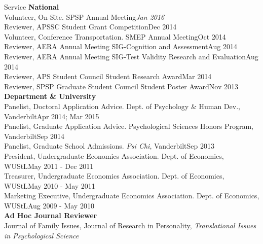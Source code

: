 \documentclass {resume}
\begin{document}
\begin{rSection}{\textrm{Service}}
{\large \textbf{National}}\\
Volunteer, On-Site. SPSP Annual Meeting\hfill{\textit{Jan 2016}}\smallskip\\
Reviewer, APSSC Student Grant Competition\hfill{Dec 2014}\smallskip\\
Volunteer, Conference Transportation. SMEP Annual Meeting\hfill{Oct 2014}\smallskip\\
Reviewer, AERA Annual Meeting SIG-Cognition and Assessment\hfill{Aug 2014}\smallskip\\%
Reviewer, AERA Annual Meeting SIG-Test Validity Research and Evaluation\hfill{Aug 2014}\smallskip\\
Reviewer, APS Student Council Student Research Award\hfill{Mar 2014}\smallskip\\
Reviewer, SPSP Graduate Student Council Student Poster Award\hfill{Nov 2013}\medskip\\
{\large \textbf{Department \& University}}\\
Panelist, Doctoral Application Advice. Dept. of Psychology \& Human Dev., Vanderbilt\hfill {Apr 2014; Mar 2015}\smallskip\\
Panelist, Graduate Application Advice. Psychological Sciences Honors Program, Vanderbilt\hfill {Sep 2014}\smallskip\\
Panelist, Graduate School Admissions. \textit{Psi Chi}, Vanderbilt\hfill {Sep 2013}\smallskip\\
President, Undergraduate Economics Association. Dept. of Economics, WUStL\hfill  {May 2011 - Dec 2011}\smallskip\\
Treasurer, Undergraduate Economics Association. Dept. of Economics, WUStL\hfill{May 2010 - May 2011}\smallskip\\
Marketing Executive, Undergraduate Economics Association. Dept. of Economics, WUStL\hfill  {Aug 2009 - May 2010}\medskip\\
{\large \textbf{Ad Hoc Journal Reviewer}}\\
Journal of Family Issues, %
Journal of Research in Personality, %
\textit{Translational Issues in Psychological Science}%
\end{rSection}
\end{document}
